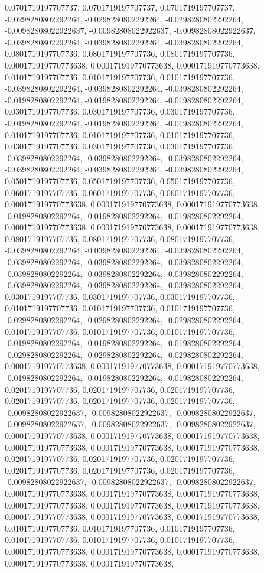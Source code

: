 \documentclass[
  ,man]{apa6}
\begin{document}
0.0701719197707737, 0.0701719197707737, 0.0701719197707737, -0.0298280802292264, -0.0298280802292264, -0.0298280802292264, -0.00982808022922637, -0.00982808022922637, -0.00982808022922637, -0.0398280802292264, -0.0398280802292264, -0.0398280802292264, 0.0801719197707736, 0.0801719197707736, 0.0801719197707736, 0.000171919770773638, 0.000171919770773638, 0.000171919770773638, 0.0101719197707736, 0.0101719197707736, 0.0101719197707736, -0.0398280802292264, -0.0398280802292264, -0.0398280802292264,
-0.0198280802292264, -0.0198280802292264, -0.0198280802292264, 0.0301719197707736, 0.0301719197707736, 0.0301719197707736, -0.0198280802292264, -0.0198280802292264, -0.0198280802292264, 0.0101719197707736, 0.0101719197707736, 0.0101719197707736, 0.0301719197707736, 0.0301719197707736, 0.0301719197707736, -0.0398280802292264, -0.0398280802292264, -0.0398280802292264, -0.0398280802292264, -0.0398280802292264, -0.0398280802292264, 0.0501719197707736, 0.0501719197707736, 0.0501719197707736, 0.0601719197707736,
0.0601719197707736, 0.0601719197707736, 0.000171919770773638, 0.000171919770773638, 0.000171919770773638, -0.0198280802292264, -0.0198280802292264, -0.0198280802292264, 0.000171919770773638, 0.000171919770773638, 0.000171919770773638, 0.0801719197707736, 0.0801719197707736, 0.0801719197707736, -0.0398280802292264, -0.0398280802292264, -0.0398280802292264, -0.0398280802292264, -0.0398280802292264, -0.0398280802292264, -0.0398280802292264, -0.0398280802292264, -0.0398280802292264, -0.0398280802292264,
-0.0398280802292264, -0.0398280802292264, 0.0301719197707736, 0.0301719197707736, 0.0301719197707736, 0.0101719197707736, 0.0101719197707736, 0.0101719197707736, -0.0298280802292264, -0.0298280802292264, -0.0298280802292264, 0.0101719197707736, 0.0101719197707736, 0.0101719197707736, -0.0198280802292264, -0.0198280802292264, -0.0198280802292264, -0.0298280802292264, -0.0298280802292264, -0.0298280802292264, 0.000171919770773638, 0.000171919770773638, 0.000171919770773638, -0.0198280802292264, -0.0198280802292264,
-0.0198280802292264, 0.0201719197707736, 0.0201719197707736, 0.0201719197707736, 0.0201719197707736, 0.0201719197707736, 0.0201719197707736, -0.00982808022922637, -0.00982808022922637, -0.00982808022922637, -0.00982808022922637, -0.00982808022922637, -0.00982808022922637, 0.000171919770773638, 0.000171919770773638, 0.000171919770773638, 0.000171919770773638, 0.000171919770773638, 0.000171919770773638, 0.0201719197707736, 0.0201719197707736, 0.0201719197707736, 0.0201719197707736, 0.0201719197707736,
0.0201719197707736, -0.00982808022922637, -0.00982808022922637, -0.00982808022922637, 0.000171919770773638, 0.000171919770773638, 0.000171919770773638, 0.000171919770773638, 0.000171919770773638, 0.000171919770773638, 0.000171919770773638, 0.000171919770773638, 0.000171919770773638, 0.0101719197707736, 0.0101719197707736, 0.0101719197707736, 0.0101719197707736, 0.0101719197707736, 0.0101719197707736, 0.000171919770773638, 0.000171919770773638, 0.000171919770773638, 0.000171919770773638, 0.000171919770773638,
\end{document}
